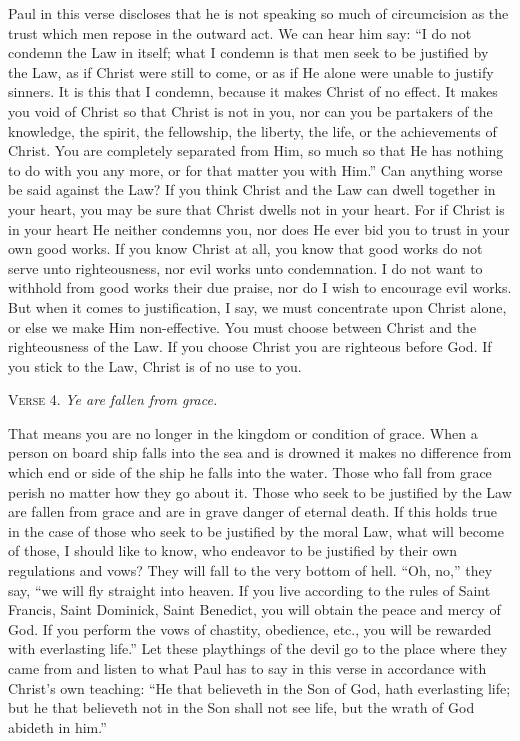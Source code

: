 Paul in this verse discloses that he is not speaking so much of circumcision as the trust which men repose in the outward act. We can hear him say: “I do not condemn the Law in itself; what I condemn is that men seek to be justified by the Law, as if Christ were still to come, or as if He alone were unable to justify sinners. It is this that I condemn, because it makes Christ of no effect. It makes you void of Christ so that Christ is not in you, nor can you be partakers of the knowledge, the spirit, the fellowship, the liberty, the life, or the achievements of Christ. You are completely separated from Him, so much so that He has nothing to do with you any more, or for that matter you with Him.” Can anything worse be said against the Law? If you think Christ and the Law can dwell together in your heart, you may be sure that Christ dwells not in your heart. For if Christ is in your heart He neither condemns you, nor does He ever bid you to trust in your own good works. If you know Christ at all, you know that good works do not serve unto righteousness, nor evil works unto condemnation. I do not want to withhold from good works their due praise, nor do I wish to encourage evil works. But when it comes to justification, I say, we must concentrate upon Christ alone, or else we make Him non-effective. You must choose between Christ and the righteousness of the Law. If you choose Christ you are righteous before God. If you stick to the Law, Christ is of no use to you.

\textsc{Verse} 4. \emph{Ye are fallen from grace.}

That means you are no longer in the kingdom or condition of grace. When a person on board ship falls into the sea and is drowned it makes no difference from which end or side of the ship he falls into the water. Those who fall from grace perish no matter how they go about it. Those who seek to be justified by the Law are fallen from grace and are in grave danger of eternal death. If this holds true in the case of those who seek to be justified by the moral Law, what will become of those, I should like to know, who endeavor to be justified by their own regulations and vows? They will fall to the very bottom of hell. “Oh, no,” they say, “we will fly straight into heaven. If you live according to the rules of Saint Francis, Saint Dominick, Saint Benedict, you will obtain the peace and mercy of God. If you perform the vows of chastity, obedience, etc., you will be rewarded with everlasting life.” Let these playthings of the devil go to the place where they came from and listen to what Paul has to say in this verse in accordance with Christ’s own teaching: “He that believeth in the Son of God, hath everlasting life; but he that believeth not in the Son shall not see life, but the wrath of God abideth in him.”

